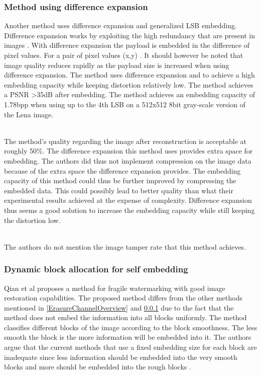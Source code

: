 \documentclass[12pt]{article}
\begin{document}
\subsubsection{Method using difference expansion}
\label{differenceExpansionOverview}
Another method \cite {tian2003high} uses difference expansion and generalized LSB embedding.
Difference expansion works by exploiting the high redundancy that are present in images \cite {tian2002reversible}.
With difference expansion the payload is embedded in the difference of pixel values. 
For a pair of pixel values (x,y) \cite {tian2002reversible}. 
It should however be noted that image quality reduces rapidly as the payload size is increased when using difference expansion. 
The method uses difference expansion and to achieve a high embedding capacity while keeping distortion relatively low.
The method achieves a PSNR \textgreater 35dB after embedding.
The method achieves an embedding capacity of 1.78bpp when using up to the 4th LSB on a 512x512 8bit gray-scale version of the Lena image.

\hspace{0pt} \\
The method's \cite {tian2003high} quality regarding the image after reconstruction is acceptable at roughly 50\%. 
The difference expansion this method uses provides extra space for embedding.
The authors did thus not implement compression on the image data because of the extra space the difference expansion provides.
The embedding capacity of this method could thus be further improved by compressing the embedded data. 
This could possibly lead to better quality than what their experimental results achieved at the expense of complexity.
Difference expansion thus seems a good solution to increase the embedding capacity while still keeping the distortion low.

\hspace{0pt} \\ 
The authors do not mention the image tamper rate that this method \cite {tian2003high} achieves.

\subsubsection{Dynamic block allocation for self embedding}
\label{DynamicBlockOverview}
Qian et al \cite{qian2011image} proposes a method for fragile watermarking with good image restoration capabilities.
The proposed method differs from the other methods mentioned in \ref{ErasureChannelOverview} and \ref{differenceExpansionOverview} due to the fact that the method does not embed the information into all blocks uniformly.
The method classifies different blocks of the image according to the block smoothness.
The less smooth the block is the more information will be embedded into it.
The authors argue that the current methods that use a fixed embedding size for each block are inadequate since less information should be embedded into the very smooth blocks and more should be embedded into the rough blocks \cite{qian2011image}.
\end{document}
